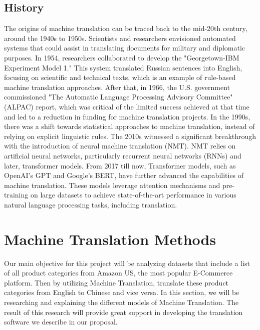 \documentclass[sigconf]{acmart}
\begin{document}
    \subsection{History} 
    The origins of machine translation can be traced back to the mid-20th century, around the 1940s to 1950s. Scientists and researchers envisioned automated systems that could assist in translating documents for military and diplomatic purposes. In 1954, researchers collaborated to develop the "Georgetown-IBM Experiment Model 1." This system translated Russian sentences into English, focusing on scientific and technical texts, which is an example of rule-based machine translation approaches. After that, in 1966, the U.S. government commissioned "The Automatic Language Processing Advisory Committee" (ALPAC) report, which was critical of the limited success achieved at that time and led to a reduction in funding for machine translation projects. In the 1990s, there was a shift towards statistical approaches to machine translation, instead of relying on explicit linguistic rules. The 2010s witnessed a significant breakthrough with the introduction of neural machine translation (NMT). NMT relies on artificial neural networks, particularly recurrent neural networks (RNNs) and later, transformer models. From 2017 till now, Transformer models, such as OpenAI's GPT and Google's BERT, have further advanced the capabilities of machine translation. These models leverage attention mechanisms and pre-training on large datasets to achieve state-of-the-art performance in various natural language processing tasks, including translation.

\section{Machine Translation Methods} %
    Our main objective for this project will be analyzing datasets that include a list of all product categories from Amazon US, the most popular E-Commerce platform. Then by utilizing Machine Translation, translate these product categories from English to Chinese and vice versa. In this section, we will be researching and explaining the different models of Machine Translation. The result of this research will provide great support in developing the translation software we describe in our proposal.
    
\end{document}
